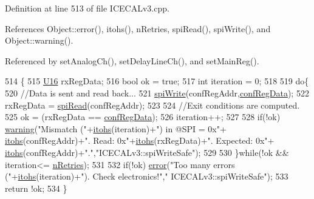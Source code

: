 Definition at line 513 of file I\+C\+E\+C\+A\+Lv3.\+cpp.



References Object\+::error(), itohs(), n\+Retries, spi\+Read(), spi\+Write(), and Object\+::warning().



Referenced by set\+Analog\+Ch(), set\+Delay\+Line\+Ch(), and set\+Main\+Reg().


\begin{DoxyCode}
514 \{
515     \hyperlink{ICECALv3_8h_adf928e51a60dba0df29d615401cc55a8}{U16} rxRegData;
516     \textcolor{keywordtype}{bool} ok = \textcolor{keyword}{true};
517     \textcolor{keywordtype}{int} iteration = 0;
518 
519     \textcolor{keywordflow}{do}\{
520         \textcolor{comment}{//Data is sent and read back...}
521         \hyperlink{classICECALv3_aef00f02801dea4bda2093c930501dcdd}{spiWrite}(confRegAddr,\hyperlink{structconfRegData}{confRegData});   
522         rxRegData = \hyperlink{classICECALv3_aced41ce20a0853d6248b8df88412e57a}{spiRead}(confRegAddr);
523 
524         \textcolor{comment}{//Exit conditions are computed.}
525         ok = (rxRegData == \hyperlink{structconfRegData}{confRegData});
526         iteration++;
527     
528         \textcolor{keywordflow}{if}(!ok) \hyperlink{classObject_a65cd4fda577711660821fd2cd5a3b4c9}{warning}(\textcolor{stringliteral}{"Mismatch ("}+\hyperlink{classICECALv3_a04b02e583f191bfce34d05132cd23834}{itohs}(iteration)+\textcolor{stringliteral}{") in @SPI = 0x"}+
      \hyperlink{classICECALv3_a04b02e583f191bfce34d05132cd23834}{itohs}(confRegAddr)+\textcolor{stringliteral}{". Read: 0x"}+\hyperlink{classICECALv3_a04b02e583f191bfce34d05132cd23834}{itohs}(rxRegData)+\textcolor{stringliteral}{". Expected: 0x"}+
      \hyperlink{classICECALv3_a04b02e583f191bfce34d05132cd23834}{itohs}(confRegAddr)+\textcolor{stringliteral}{"."},\textcolor{stringliteral}{"ICECALv3::spiWriteSafe"}); 
529 
530     \}\textcolor{keywordflow}{while}(!ok && iteration<= \hyperlink{classICECALv3_ae877ce34b3a4d6c368cc6409ac9614fa}{nRetries});
531 
532     \textcolor{keywordflow}{if}(!ok) \hyperlink{classObject_a204a95f57818c0f811933917a30eff45}{error}(\textcolor{stringliteral}{"Too many errors ("}+\hyperlink{classICECALv3_a04b02e583f191bfce34d05132cd23834}{itohs}(iteration)+\textcolor{stringliteral}{"). Check electronics!"},\textcolor{stringliteral}{"
      ICECALv3::spiWriteSafe"});
533     \textcolor{keywordflow}{return} !ok;
534 \}
\end{DoxyCode}
\mbox{\label{classObject_a73a0f1a41828fdd8303dd662446fb6c3}} 
